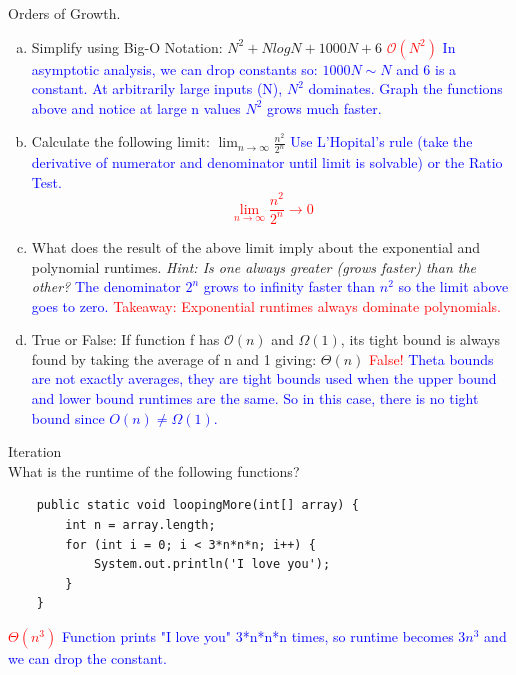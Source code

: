 \documentclass[11pt,letterpaper]{article}
\begin{document}


\problem Orders of Growth. 
\begin{enumerate}[(a)]
    \item Simplify using Big-O Notation: $N^{2} + NlogN + 1000N + 6$
        \pspace
        \textcolor{red}{$\mathcal{O}(N^2)$}
        \newline
        \textcolor{blue}{In asymptotic analysis, we can drop constants so: $1000N \sim N$ and 6 is a constant. At arbitrarily large inputs (N), $N^2$ dominates. Graph the functions above and notice at large n values $N^2$ grows much faster.}
        \pspace
    \item Calculate the following limit:
    $\lim_{n \to \infty} \frac{n^{2}}{2^{n}}$
        \pspace
        \textcolor{blue}{Use L'Hopital's rule (take the derivative of numerator and denominator until limit is solvable) or the Ratio Test.}
        \newline
        \textcolor{red}{$$\lim_{n \to \infty} \frac{n^{2}}{2^{n}} \rightarrow 0$$}
        \pspace
    \item What does the result of the above limit imply about the exponential and polynomial runtimes. 
    \textit{Hint: Is one always greater (grows faster) than the other?}
        \pspace
        \textcolor{blue}{The denominator $2^n$ grows to infinity faster than $n^2$ so the limit above goes to zero.}
        \newline
        \textcolor{red}{Takeaway: Exponential runtimes always dominate polynomials.}
        \pspace
    \item True or False: If function f has $\mathcal{O}(n)$ and $\Omega(1)$, its tight bound is always found by taking the average of n and 1 giving: $\Theta(n)$
        \pspace
        \textcolor{red}{False!}
        \newline
        \textcolor{blue}{Theta bounds are not exactly averages, they are tight bounds used when the upper bound and lower bound runtimes are the same. So in this case, there is no tight bound since $O(n) \neq \Omega(1)$.}
\end{enumerate}
\pspace
\newpage


\problem Iteration
\\ 
What is the runtime of the following functions?
\begin{lstlisting} 
    public static void loopingMore(int[] array) {
        int n = array.length;
        for (int i = 0; i < 3*n*n*n; i++) {
            System.out.println('I love you');
        }
    }
\end{lstlisting}
\textcolor{red}{$\Theta(n^3)$} \newline
\textcolor{blue}{Function prints "I love you" 3*n*n*n times, so runtime becomes $3n^3$ and we can drop the constant.}
\pspace
\pspace
\end{document}
